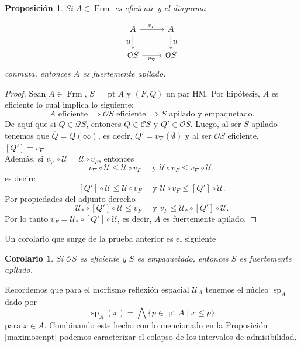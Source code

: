 \documentclass[11pt]{amsart}
\DeclareMathOperator{\pt}{pt}
\DeclareMathOperator{\Sp}{sp}
\DeclareMathOperator{\Frm}{Frm}
\theoremstyle{plain}
\newtheorem{cor}[thm]{Corolario}
\newtheorem{prop}[thm]{Proposición}
\theoremstyle{definition}
\begin{document}
\begin{prop}\label{EficienteFapilado}
  Si $A\in \Frm$ es eficiente y el diagrama 

\[\begin{tikzcd}
	A & A \\
	{\mathcal{O}S} & {\mathcal{O}S}
	\arrow["{v_F}", from=1-1, to=1-2]
	\arrow["{\mathcal{U}}"', from=1-1, to=2-1]
	\arrow["{\mathcal{U}}", from=1-2, to=2-2]
	\arrow["{v_\nabla}"', from=2-1, to=2-2]
\end{tikzcd}\]
conmuta, entonces $A$ es fuertemente apilado.
\end{prop}

\begin{proof}
Sean $A\in\Frm$, $S=\pt A$ y $(F, Q)$ un par HM. Por hipótesis, $A$ es eficiente lo cual implica lo siguiente:
\[
A\text{ eficiente }\Rightarrow \mathcal{O}S\text{ eficiente }\Rightarrow S \text{ apilado y empaquetado.}
\]
De aquí que si $Q\in \mathcal{Q}S$, entonces $Q\in \mathcal{C}S$ y $Q'\in \mathcal{O}S$. Luego, al ser $S$ apilado tenemos que
$\overline{Q}=Q(\infty)$, es decir, $Q'=v_\nabla(\emptyset)$ y al ser $\mathcal{O}S$ eficiente, $[Q']=v_\nabla$.\\
  
Además, si $v_\nabla\circ \mathcal{U}=\mathcal{U}\circ v_F$, entonces
\[
v_\nabla\circ \mathcal{U}\leq \mathcal{U}\circ v_F\quad \text{ y } \mathcal{U}\circ v_F\leq v_\nabla\circ \mathcal{U},
\]
es decirc 
\[
[Q']\circ \mathcal{U}\leq \mathcal{U}\circ v_F\quad \text{ y } \mathcal{U}\circ v_F\leq [Q']\circ \mathcal{U}.
\]
Por propiedades del adjunto derecho 
\[
\mathcal{U}_*\circ [Q']\circ \mathcal{U}\leq v_F\quad \text{ y } v_F\leq\mathcal{U}_*\circ [Q']\circ \mathcal{U}.
\]
Por lo tanto $v_F=\mathcal{U}_*\circ [Q']\circ \mathcal{U}$, es decir, $A$ es fuertemente apilado.
\end{proof}

Un corolario que surge de la prueba anterior es el siguiente

\begin{cor}
Si $\mathcal{O}S$ es eficiente y $S$ es empaquetado, entonces $S$ es fuertemente apilado.
\end{cor}

Recordemos que para el morfismo reflexión espacial $\mathcal{U}_A$ tenemos el núcleo $\Sp_A$ dado por
\[
\Sp_A(x)=\bigwedge\{p\in \pt A\mid x\leq p\}
\]
para $x\in A$. Combinando este hecho con lo mencionado en la Proposición \ref{maximosenpt} podemos caracterizar el colapso de 
los intervalos de admisibilidad.
\end{document}
